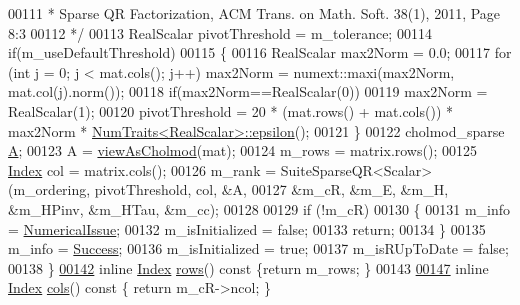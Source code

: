\begin{DoxyCode}
00111 \textcolor{comment}{       * Sparse QR Factorization, ACM Trans. on Math. Soft. 38(1), 2011, Page 8:3 }
00112 \textcolor{comment}{       */}
00113       RealScalar pivotThreshold = m\_tolerance;
00114       \textcolor{keywordflow}{if}(m\_useDefaultThreshold) 
00115       \{
00116         RealScalar max2Norm = 0.0;
00117         \textcolor{keywordflow}{for} (\textcolor{keywordtype}{int} j = 0; j < mat.cols(); j++) max2Norm = numext::maxi(max2Norm, mat.col(j).norm());
00118         \textcolor{keywordflow}{if}(max2Norm==RealScalar(0))
00119           max2Norm = RealScalar(1);
00120         pivotThreshold = 20 * (mat.rows() + mat.cols()) * max2Norm * 
      \hyperlink{group___core___module_struct_eigen_1_1_num_traits}{NumTraits<RealScalar>::epsilon}();
00121       \}
00122       cholmod\_sparse \hyperlink{group___core___module_class_eigen_1_1_matrix}{A}; 
00123       A = \hyperlink{namespace_eigen_ac9fb9e40cfc9ddbdc7da84ee01bb7545}{viewAsCholmod}(mat);
00124       m\_rows = matrix.rows();
00125       \hyperlink{namespace_eigen_a62e77e0933482dafde8fe197d9a2cfde}{Index} col = matrix.cols();
00126       m\_rank = SuiteSparseQR<Scalar>(m\_ordering, pivotThreshold, col, &A, 
00127                              &m\_cR, &m\_E, &m\_H, &m\_HPinv, &m\_HTau, &m\_cc);
00128 
00129       \textcolor{keywordflow}{if} (!m\_cR)
00130       \{
00131         m\_info = \hyperlink{group__enums_gga85fad7b87587764e5cf6b513a9e0ee5eaaf9b736d310a664e7729d163a035cc5f}{NumericalIssue};
00132         m\_isInitialized = \textcolor{keyword}{false};
00133         \textcolor{keywordflow}{return};
00134       \}
00135       m\_info = \hyperlink{group__enums_gga85fad7b87587764e5cf6b513a9e0ee5ea52581b035f4b59c203b8ff999ef5fcea}{Success};
00136       m\_isInitialized = \textcolor{keyword}{true};
00137       m\_isRUpToDate = \textcolor{keyword}{false};
00138     \}
\hyperlink{class_eigen_1_1_s_p_q_r_a775e28a44fd466638114edbcd17ea50a}{00142}     \textcolor{keyword}{inline} \hyperlink{namespace_eigen_a62e77e0933482dafde8fe197d9a2cfde}{Index} \hyperlink{class_eigen_1_1_s_p_q_r_a775e28a44fd466638114edbcd17ea50a}{rows}()\textcolor{keyword}{ const }\{\textcolor{keywordflow}{return} m\_rows; \}
00143     
\hyperlink{class_eigen_1_1_s_p_q_r_aa006d40963b05c7525b5ca0b02364d84}{00147}     \textcolor{keyword}{inline} \hyperlink{namespace_eigen_a62e77e0933482dafde8fe197d9a2cfde}{Index} \hyperlink{class_eigen_1_1_s_p_q_r_aa006d40963b05c7525b5ca0b02364d84}{cols}()\textcolor{keyword}{ const }\{ \textcolor{keywordflow}{return} m\_cR->ncol; \}

\end{DoxyCode}
